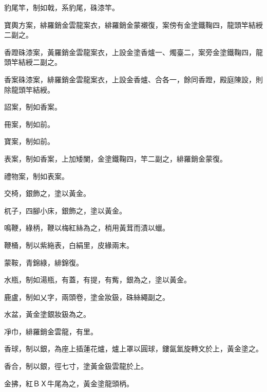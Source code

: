\begin{pinyinscope}
 豹尾竿，制如戟，系豹尾，硃漆竿。



 寶輿方案，緋羅銷金雲龍案衣，緋羅銷金蒙襯復，案傍有金塗鐵鞠四，龍頭竿結綬二副之。



 香蹬硃漆案，黃羅銷金雲龍案衣，上設金塗香爐一、燭臺二，案旁金塗鐵鞠四，龍頭竿結綬二副之。



 香案硃漆案，緋羅銷金雲龍案衣，上設金香爐、合各一，餘同香蹬，殿庭陳設，則除龍頭竿結綬。



 詔案，制如香案。



 冊案，制如前。



 寶案，制如前。



 表案，制如香案，上加矮闌，金塗鐵鞠四，竿二副之，緋羅銷金蒙復。



 禮物案，制如表案。



 交椅，銀飾之，塗以黃金。



 杌子，四腳小床，銀飾之，塗以黃金。



 鳴鞭，綠柄，鞭以梅紅絲為之，梢用黃茸而漬以蠟。



 鞭桶，制以紫絁表，白絹里，皮緣兩末。



 蒙鞍，青錦綠，緋錦復。



 水瓶，制如湯瓶，有蓋，有提，有觜，銀為之，塗以黃金。



 鹿盧，制如乂字，兩頭卷，塗金妝鈒，硃絲繩副之。



 水盆，黃金塗銀妝鈒為之。



 凈巾，緋羅銷金雲龍，有里。



 香球，制以銀，為座上插蓮花爐，爐上罩以圓球，鏤氤氳旋轉文於上，黃金塗之。



 香合，制以銀，徑七寸，塗黃金鈒雲龍於上。



 金拂，紅ＢＸ牛尾為之，黃金塗龍頭柄。




\end{pinyinscope}
